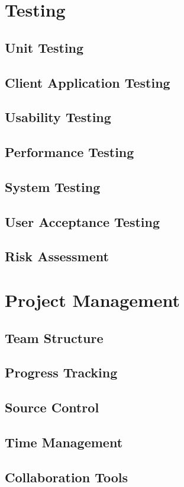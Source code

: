 \documentclass[12pt,a4paper,twoside]{report}
\begin{document}
\chapter{Testing}
	\section{Unit Testing}
	\section{Client Application Testing}
	\section{Usability Testing}
	\section{Performance Testing}
	\section{System Testing}
	\section{User Acceptance Testing}
	\section{Risk Assessment}

\chapter{Project Management}
	\section{Team Structure}
	\section{Progress Tracking}
	\section{Source Control}
	\section{Time Management}
	\section{Collaboration Tools}
\end{document}
